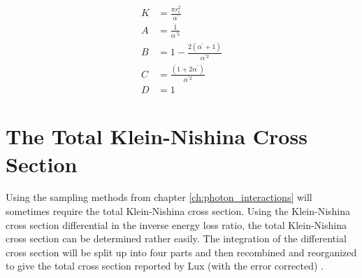 \begin{align}
  K & = \frac{\pi r_e^2}{\alpha^{'}} \nonumber \\
  A & = \frac{1}{\alpha^{'2}} \nonumber \\
  B & = 1 - \frac{2(\alpha^{'}+1)}{\alpha^{'2}} \nonumber \\
  C & = \frac{(1+2\alpha^{'})}{\alpha^{'2}} \nonumber \\
  D & = 1 \nonumber 
\end{align}

\section{The Total Klein-Nishina Cross Section}
Using the sampling methods from chapter \ref{ch:photon_interactions} will 
sometimes require the total Klein-Nishina cross section. Using the 
Klein-Nishina cross section differential in the inverse energy loss ratio,
the total Klein-Nishina cross section can be determined rather easily. The
integration of the differential cross section will be split up into four parts
and then recombined and reorganized to give the total cross section reported by 
Lux (with the error corrected) \citep{lux_monte_1991}. 
